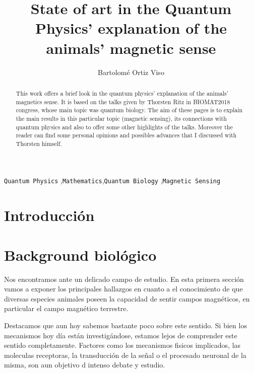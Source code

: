 \documentclass[1p]{elsarticle}
\begin{document}
\begin{frontmatter}

\title{State of art in the Quantum Physics' explanation of the animals' magnetic sense }

\author{Bartolomé Ortiz Viso}
\address{Master en Física y Matemáticas\\ Universidad de Granada\\23/06/2018}

\begin{abstract}
This work offers a brief look in the quantum physics' explanation of the animals' magnetics sense. It is based on the talks given by Thorsten Ritz in BIOMAT2018 congress, whose main topic was quantum biology. The aim of these pages is to explain the main results in this particular topic (magnetic sensing), its connections with quantum physics and also to offer some other highlights of the talks. Moreover the reader can find some personal opinions and possibles advances that I discussed with Thorsten himself. 
\end{abstract}

\begin{keyword}
 \texttt{Quantum Physics} \sep \texttt{Mathematics}\sep \texttt{Quantum Biology} \sep \texttt{Magnetic Sensing}
\end{keyword}

\end{frontmatter}
\setlength\parindent{0pt}
\linenumbers

\section{Introducción}


\section{Background biológico}

Nos encontramos ante un delicado campo de estudio. En esta primera sección vamos a exponer los principales hallazgos en cuanto a el conocimiento de que diversas especies animales poseen la capacidad de sentir campos magnéticos, en particular el campo magnético terrestre.

Destacamos que aun hoy sabemos bastante poco sobre este sentido. Si bien los mecanismos hoy día están investigándose, estamos lejos de comprender este sentido completamente. Factores como los mecanismos fisicos implicados, las moleculas receptoras, la transducción de la señal o el procesado neuronal de la misma, son aun objetivo d intenso debate y estudio.
\end{document}
